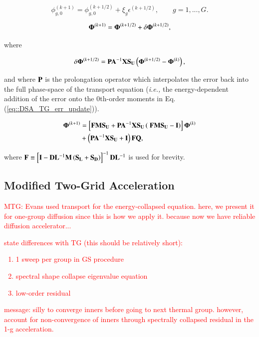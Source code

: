 \documentclass[preprint,10pt]{elsarticle}
\newcommand{\tcr}[1]{\textcolor{red}{#1}}
\begin{document}
\begin{equation}
\label{eq::DSA_TG_err_update}
 \phi_{g,0}^{(k+1)} =  \phi_{g,0}^{(k+1/2)}  + \xi_g \epsilon^{(k+1/2)}, \qquad g=1,...,G .
\end{equation}

\begin{equation}
\label{eq::DSA_TG_update_op}
 {\bf \Phi}^{(k+1)} =  {\bf \Phi}^{(k+1/2)}  + \delta {\bf \Phi}^{(k+1/2)} ,
\end{equation}

\noindent where 

\begin{equation}
\label{eq::DSA_TG_proj_err}
\delta {\bf \Phi}^{(k+1/2)} =  {\bf P} {\bf A}^{-1}  {\bf X} {\bf S_{U}} \left(  {\bf \Phi}^{(k+1/2)} - {\bf \Phi}^{(k)}  \right),
\end{equation}

\noindent and where ${\bf P}$ is the prolongation operator which interpolates the error back into the full phase-space of the transport equation ({\em i.e.,} the energy-dependent addition of the error onto the 0th-order moments in Eq. (\ref{eq::DSA_TG_err_update})).



\begin{equation}
\label{eq::DSA_TG_GS_op_update_simple}
\begin{aligned}
 {\bf \Phi}^{(k+1)} &= \left[ {\bf F}  {\bf M} {\bf S_U} +  {\bf P} {\bf A}^{-1}  {\bf X} {\bf S_{U}} \left(  \ {\bf F}  {\bf M} {\bf S_U}  -  {\bf I} \right) \right] {\bf \Phi}^{(k)} \\
 &+ \left(  {\bf P} {\bf A}^{-1}  {\bf X} {\bf S_{U}}  + {\bf I} \right) {\bf F} {\bf Q} ,
\end{aligned}
\end{equation}

\noindent where ${\bf F} \equiv \left[ {\bf I} - {\bf D}{\bf L}^{-1} {\bf M} \left(  {\bf S_L} + {\bf S_D} \right) \right]^{-1} {\bf D}{\bf L}^{-1}$ is used for brevity.

\subsection{Modified Two-Grid Acceleration}
\tcr{MTG: Evans used transport for the energy-collapsed equation. here, we present it for one-group diffusion since this is how we apply it. because now we have reliable diffusion accelerator...}
\tcr
{
state differences with TG (this should be relatively short):
\begin{enumerate}
\item 1 sweep per group in GS procedure
\item spectral shape collapse eigenvalue equation
\item low-order residual
\end{enumerate}
message: silly to converge inners before going to next thermal group. however, account for non-convergence of inners through spectrally collapsed residual in the 1-g acceleration.}
\end{document}
